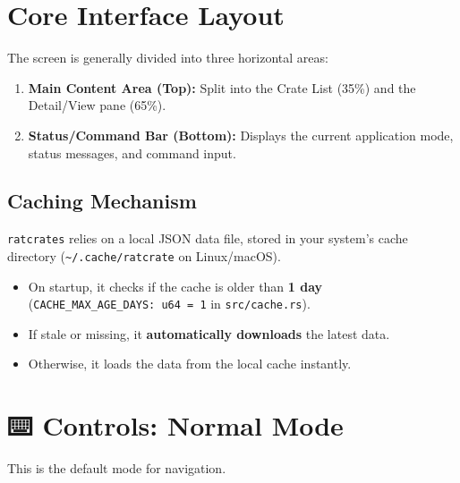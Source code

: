 \documentclass[
  letterpaper,
  DIV=11,
  numbers=noendperiod]{scrreprt}
\providecommand{\tightlist}{%
  \setlength{\itemsep}{0pt}\setlength{\parskip}{0pt}}
\begin{document}
\section{Core Interface Layout}\label{core-interface-layout}

The screen is generally divided into three horizontal areas:

\begin{enumerate}
\def\labelenumi{\arabic{enumi}.}
\tightlist
\item
  \textbf{Main Content Area (Top):} Split into the Crate List (35\%) and
  the Detail/View pane (65\%).
\item
  \textbf{Status/Command Bar (Bottom):} Displays the current application
  mode, status messages, and command input.
\end{enumerate}

\subsection{Caching Mechanism}\label{caching-mechanism}

\texttt{ratcrates} relies on a local JSON data file, stored in your
system's cache directory (\texttt{\textasciitilde{}/.cache/ratcrate} on
Linux/macOS).

\begin{itemize}
\tightlist
\item
  On startup, it checks if the cache is older than \textbf{1 day}
  (\texttt{CACHE\_MAX\_AGE\_DAYS:\ u64\ =\ 1} in \texttt{src/cache.rs}).
\item
  If stale or missing, it \textbf{automatically downloads} the latest
  data.
\item
  Otherwise, it loads the data from the local cache instantly.
\end{itemize}

\section{⌨️ Controls: Normal Mode}\label{controls-normal-mode}

This is the default mode for navigation.
\end{document}

